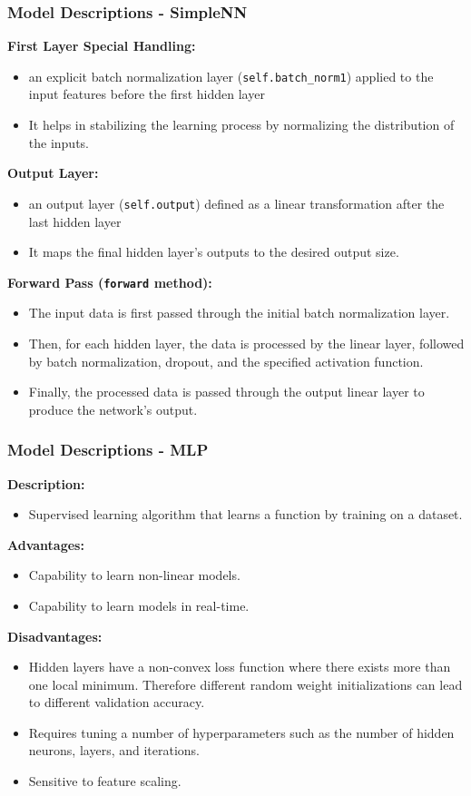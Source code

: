 \documentclass[10pt]{beamer}
\begin{document}
\begin{frame}
\frametitle{Model Descriptions - SimpleNN}
\textbf{First Layer Special Handling:}
\begin{itemize}
\item an explicit batch normalization layer (\texttt{self.batch\_norm1}) applied to the input features before the first hidden layer
\item It helps in stabilizing the learning process by normalizing the distribution of the inputs.
\end{itemize}

\textbf{Output Layer:}
\begin{itemize}
\item an output layer (\texttt{self.output}) defined as a linear transformation after the last hidden layer
\item It maps the final hidden layer's outputs to the desired output size.
\end{itemize}

\textbf{Forward Pass (\texttt{forward} method):}
\begin{itemize}
\item The input data is first passed through the initial batch normalization layer.
\item Then, for each hidden layer, the data is processed by the linear layer, followed by batch normalization, dropout, and the specified activation function.
\item Finally, the processed data is passed through the output linear layer to produce the network's output.
\end{itemize}
\end{frame}

\begin{frame}
\frametitle{Model Descriptions - MLP}
\textbf{Description:}
\begin{itemize}
\item Supervised learning algorithm that learns a function by training on a dataset.
\end{itemize}
\textbf{Advantages:}
\begin{itemize}
\item Capability to learn non-linear models.
\item Capability to learn models in real-time.
\end{itemize}
\textbf{Disadvantages:}
\begin{itemize}
\item Hidden layers have a non-convex loss function where there exists more than one local minimum.
Therefore different random weight initializations can lead to different validation accuracy.
\item Requires tuning a number of hyperparameters such as the number of hidden neurons, layers, and iterations.
\item Sensitive to feature scaling.
\end{itemize}
\end{frame}
\end{document}
